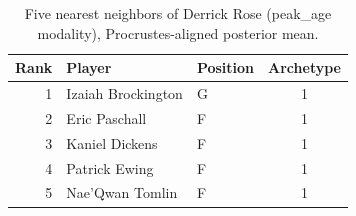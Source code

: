 \begin{table}[htbp]
  \centering\small
  \begin{tabular}{rllc}
    \toprule
    Rank & Player & Position & Archetype \\
    \midrule
    1 & Izaiah Brockington & G & 1 \\
    2 & Eric Paschall & F & 1 \\
    3 & Kaniel Dickens & F & 1 \\
    4 & Patrick Ewing & F & 1 \\
    5 & Nae'Qwan Tomlin & F & 1 \\
    \bottomrule
  \end{tabular}
  \caption{Five nearest neighbors of Derrick Rose (peak_age modality), Procrustes-aligned posterior mean.}
  \label{tab:Derrick_Rose_neighbors_peak_age}
\end{table}

